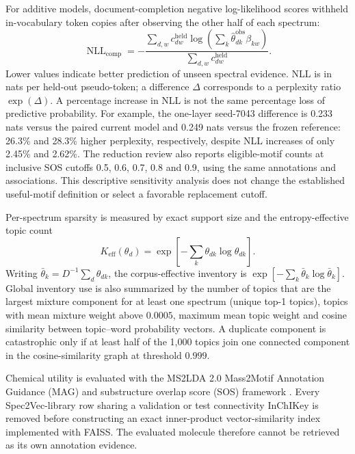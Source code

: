 \documentclass[10pt,a4paper]{article}
\begin{document}
For additive models, document-completion negative log-likelihood scores withheld in-vocabulary token
copies after observing the other half of each spectrum:
\begin{equation}
  \operatorname{NLL}_{\mathrm{comp}}
  =-\frac{\sum_{d,w}c^{\mathrm{held}}_{dw}
  \log\left(\sum_k\widehat\theta^{\mathrm{obs}}_{dk}\beta_{kw}\right)}
  {\sum_{d,w}c^{\mathrm{held}}_{dw}}.
  \label{eq:completion-nll}
\end{equation}
Lower values indicate better prediction of unseen spectral evidence. NLL is
in nats per held-out pseudo-token; a difference $\Delta$ corresponds to a
perplexity ratio $\exp(\Delta)$. A percentage increase in NLL is not the same
percentage loss of predictive probability. For example, the one-layer
seed-7043 difference is 0.233 nats versus the paired current model and 0.249
nats versus the frozen reference: 26.3\% and 28.3\% higher perplexity,
respectively, despite NLL increases of only 2.45\% and 2.62\%.
The reduction review also reports eligible-motif counts at inclusive SOS
cutoffs 0.5, 0.6, 0.7, 0.8 and 0.9, using the same annotations and associations.
This descriptive sensitivity analysis does not change the established
useful-motif definition or select a favorable replacement cutoff.

Per-spectrum sparsity is measured by exact support size and the
entropy-effective topic count
\begin{equation}
  K_{\mathrm{eff}}(\theta_d)=
  \exp\left[-\sum_k\theta_{dk}\log\theta_{dk}\right].
\end{equation}
Writing $\bar\theta_k=D^{-1}\sum_d\theta_{dk}$, the corpus-effective inventory is
$\exp[-\sum_k\bar\theta_k\log\bar\theta_k]$. Global inventory use is also
summarized by the number of topics that are the largest mixture component for
at least one spectrum (unique top-1 topics), topics with mean mixture weight
above $0.0005$, maximum mean topic weight and cosine similarity between
topic--word probability vectors. A duplicate component is catastrophic only if
at least half of the 1,000 topics join one connected component in the
cosine-similarity graph at threshold $0.999$.

Chemical utility is evaluated with the MS2LDA 2.0 Mass2Motif Annotation
Guidance (MAG) and substructure overlap score (SOS) framework
\cite{torresortega2026}. Every Spec2Vec-library row sharing a validation or test
connectivity InChIKey is removed before constructing an exact inner-product
vector-similarity index implemented with FAISS. The evaluated molecule
therefore cannot be retrieved as its own annotation evidence.
\end{document}
